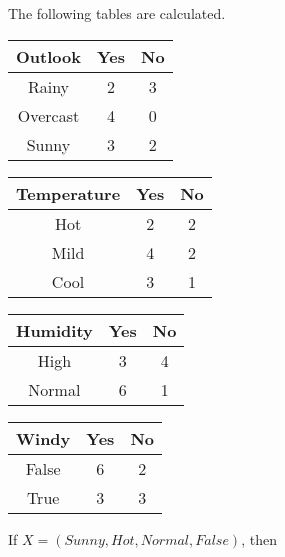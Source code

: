 \documentclass[11pt, a4paper]{article}
\begin{document}
\noindent The following tables are calculated.

\begin{table}[h!]
	\centering
	\label{tab:table2}
	\begin{tabular}{c|cc}
		\toprule
		\textbf{Outlook} & \textbf{Yes} & \textbf{No} \\
		\midrule
		Rainy            & 2            & 3           \\
		Overcast         & 4            & 0           \\
		Sunny            & 3            & 2           \\
	\end{tabular}
	\hspace{2em}
	\vspace{2em}
	\label{tab:table3}
	\begin{tabular}{c|cc}
		\toprule
		\textbf{Temperature} & \textbf{Yes} & \textbf{No} \\
		\midrule
		Hot                  & 2            & 2           \\
		Mild                 & 4            & 2           \\
		Cool                 & 3            & 1           \\
	\end{tabular}
	\label{tab:table4}
	\begin{tabular}{c|cc}
		\toprule
		\textbf{Humidity} & \textbf{Yes} & \textbf{No} \\
		\midrule
		High              & 3            & 4           \\
		Normal            & 6            & 1           \\
	\end{tabular}
	\hspace{2em}
	\label{tab:table5}
	\begin{tabular}{c|cc}
		\toprule
		\textbf{Windy} & \textbf{Yes} & \textbf{No} \\
		\midrule
		False          & 6            & 2           \\
		True           & 3            & 3           \\
	\end{tabular}
\end{table}

If $X = (Sunny, Hot, Normal, False)$, then 
\end{document}
